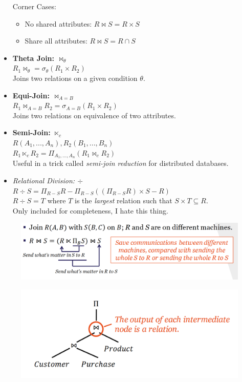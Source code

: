 \begin{itemize}
Corner Cases: \begin{itemize}
\item No shared attributes: $R \Join S = R \times S$
\item Share all attributes: $R \Join S = R \cap S$
\end{itemize}
\item \textbf{Theta Join: $\Join_\theta$}\\
$R_1 \Join_\theta = \sigma_\theta(R_1 \times R_2)$\\
Joins two relations on a given condition $\theta$.
\item \textbf{Equi-Join: $\Join_{A=B}$}\\
$R_1 \Join_{A=B} R_2 = \sigma_{A=B}(R_1 \times R_2)$\\
Joins two relations on equivalence of two attributes.
\item \textbf{Semi-Join: $\ltimes_c$}\\
$R(A_1, ..., A_n), R_2(B_1, ..., B_n)$\\
$R_1 \ltimes_c R_2 = \Pi_{A_1, ..., A_n}(R_1 \Join_c R_2)$\\
Useful in a trick called \textit{semi-join reduction} for distributed databases.
\item \textit{Relational Division: $\div$}\\
$R \div S = \Pi_{R-S}R - \Pi_{R-S}((\Pi_{R-S}R) \times S - R)$\\
$R \div S = T$ where $T$ is the \textit{largest} relation such that $S \times T \subseteq R$.\\
Only included for completeness, I hate this thing.
\end{itemize}
\begin{figure}[H]
\begin{minipage}[t]{.5\textwidth}
\centering
\includegraphics[width=\textwidth]{images/semi-join_reduction.PNG}
\label{semi_join_reduction}
\end{minipage}
\begin{minipage}[t]{.5\textwidth}
\centering
\includegraphics[width=\textwidth]{images/relational_algebra_expression.PNG}
\label{relational_algebra_expression}
\end{minipage}
\end{figure}

